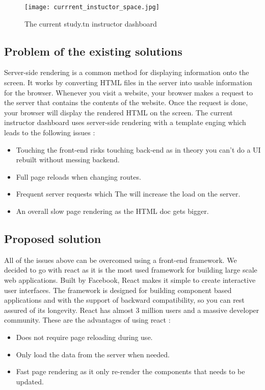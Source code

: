 \begin{figure}[!ht]
    \centering
    \texttt{[image: currrent\_instuctor\_space.jpg]}
    \caption{The current study.tn instructor dashboard}
    \label{fig:currrent_instuctor_space}
\end{figure}

\subsection{Problem of the existing solutions}
Server-side rendering is a common method for displaying information onto the screen. It works by converting HTML files in the server into usable information for the browser. Whenever you visit a website, your browser makes a request to the server that contains the contents of the website. Once the request is done, your browser will display the rendered HTML on the screen. The current instructor dashboard uses server-side rendering with a template enging which leads to the following issues : 
\begin{itemize}
  \item Touching the front-end risks touching back-end as in theory you can't do a UI rebuilt without messing backend.
  \item Full page reloads when changing routes.
  \item Frequent server requests which The will increase the load on the server.
  \item An overall slow page rendering as the HTML doc gets bigger.

\end{itemize}

\subsection{Proposed solution}
All of the issues above can be overcomed using a front-end framework. We decided to go with react as it is the most used framework for building large scale web applications. Built by Facebook, React makes it simple to create interactive user interfaces. The framework is designed for building component based applications and with the support of backward compatibility, so you can rest assured of its longevity. React has almost 3 million users and a massive developer community. These are the advantages of using react :


\begin{itemize}
  \item Does not require page reloading during use.
  \item Only load the data from the server when needed.
  \item Fast page rendering as it only re-render the components that needs to be updated.
\end{itemize}


